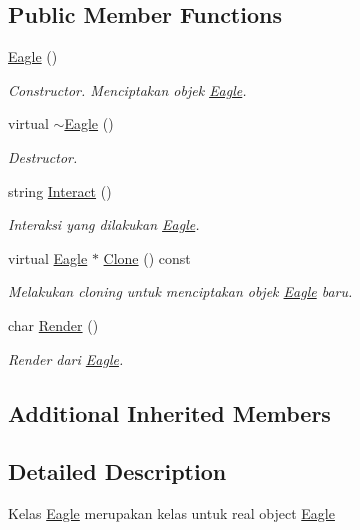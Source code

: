 \subsection*{Public Member Functions}
\begin{DoxyCompactItemize}
\item 
\hyperlink{classEagle_a8b205e5b26bece07d18b852b042851fe}{Eagle} ()
\begin{DoxyCompactList}\small\item\em Constructor. Menciptakan objek \hyperlink{classEagle}{Eagle}. \end{DoxyCompactList}\item 
virtual \hyperlink{classEagle_a530318b3eb744ad26c9060d61aa314fe}{$\sim$\+Eagle} ()
\begin{DoxyCompactList}\small\item\em Destructor. \end{DoxyCompactList}\item 
string \hyperlink{classEagle_a64abae4f80bcdcba7dac9f03126f42aa}{Interact} ()
\begin{DoxyCompactList}\small\item\em Interaksi yang dilakukan \hyperlink{classEagle}{Eagle}. \end{DoxyCompactList}\item 
virtual \hyperlink{classEagle}{Eagle} $\ast$ \hyperlink{classEagle_ace8cb419354688615938d2a53d5c1566}{Clone} () const 
\begin{DoxyCompactList}\small\item\em Melakukan cloning untuk menciptakan objek \hyperlink{classEagle}{Eagle} baru. \end{DoxyCompactList}\item 
char \hyperlink{classEagle_a34e512cb19b5ba1f8a7bce937c57f33f}{Render} ()
\begin{DoxyCompactList}\small\item\em Render dari \hyperlink{classEagle}{Eagle}. \end{DoxyCompactList}\end{DoxyCompactItemize}
\subsection*{Additional Inherited Members}


\subsection{Detailed Description}
Kelas \hyperlink{classEagle}{Eagle} merupakan kelas untuk real object \hyperlink{classEagle}{Eagle} 


